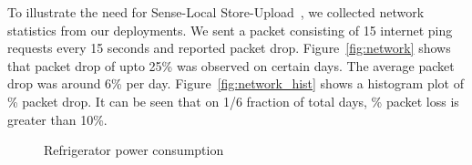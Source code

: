 \documentclass[10pt]{sensys-proc}
\newcommand{\figref}[1]{Figure~\ref{#1}}
\newcommand{\paradigms}{Sense-Local Store-Upload~}
\begin{document}
\noindent To illustrate the need for \paradigms, we collected network statistics from our deployments. We sent a packet consisting of 15 internet ping requests every 15 seconds and reported packet drop. \figref{fig:network} shows that packet drop of upto 25\% was observed on certain days. The average packet drop was around 6\% per day. \figref{fig:network_hist} shows a histogram plot of \% packet drop. It can be seen that on 1/6 fraction of total days, \% packet loss is greater than 10\%.


\begin{figure}
       
   \vspace{-3mm}
    \caption{Refrigerator power consumption}
    \label{fig:metadata}

\end{figure}
	
\end{document}
